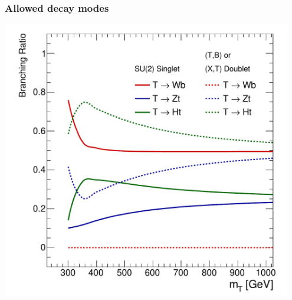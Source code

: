\begin{frame}\frametitle{Allowed decay modes}
\centering\myskip

\begin{minipage}{.4\textwidth}\centering
\scriptsize
  
\end{minipage}\begin{minipage}{.6\textwidth}\centering
  \includegraphics[width=0.95\textwidth]{../vlq_analysis/figures/fig_02a.pdf}
\end{minipage}

\end{frame}







